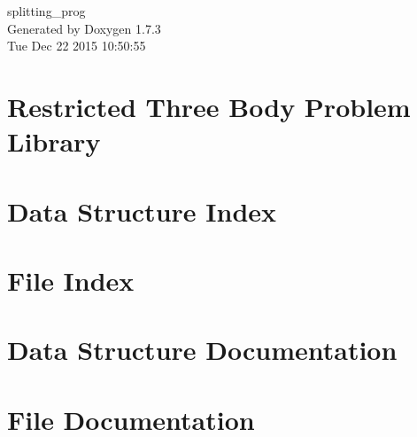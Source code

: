 \documentclass[a4paper]{book}
\begin{document}
\hypersetup{pageanchor=false}
\begin{titlepage}
\vspace*{7cm}
\begin{center}
{\Large splitting\_\-prog }\\
\vspace*{1cm}
{\large Generated by Doxygen 1.7.3}\\
\vspace*{0.5cm}
{\small Tue Dec 22 2015 10:50:55}\\
\end{center}
\end{titlepage}
\clearemptydoublepage
{}
\tableofcontents
\clearemptydoublepage
{}
\hypersetup{pageanchor=true}
\chapter{Restricted Three Body Problem Library}
\label{index}\hypertarget{index}{}
\chapter{Data Structure Index}

\chapter{File Index}

\chapter{Data Structure Documentation}












\chapter{File Documentation}





































\printindex
\end{document}
